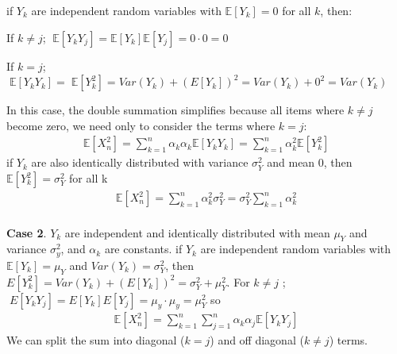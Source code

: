 if $Y_k$ are independent random variables with $\mathbb{E}[Y_k] = 0$ for all $k$, then:

If $k \ne  j$;  $\;\mathbb{E}[Y_kY_j]= \mathbb{E}[Y_k]\mathbb{E}[Y_j]=0\cdot 0=0$

If $k = j$;  $\;\mathbb{E}[Y_kY_k] = \;\mathbb{E}[Y_k^2] = Var(Y_k) + (E[Y_k])^2 = Var(Y_k) + 0^2=Var(Y_k)$

In this case, the double summation simplifies because all items where $k \ne j$ become zero, we need only to consider the terms where $k=j$:
\begin{align*}
\mathbb{E}[X_n^2]=\sum_{k=1}^n\alpha_k\alpha_k \mathbb{E}[Y_kY_k] = \sum_{k=1}^n \alpha_k^2  \mathbb{E}[Y_k^2]
\end{align*}
if $Y_k$ are also identically distributed with variance $\sigma_Y^2$ and mean 0, then $\mathbb{E}[Y_k^2]=\sigma_Y^2$ for all k
\begin{align*}
\mathbb{E}[X_n^2]=\sum_{k=1}^n\alpha_k^2 \sigma_Y^2 = \sigma_Y^2 \sum_{k=1}^n\alpha_k^2
\end{align*}
\\
\textbf{Case 2}. $Y_k$ are independent and identically distributed with mean $\mu_Y$ and variance $\sigma_y^2$, and $\alpha_k$ are constants.
if $Y_k$ are independent random variables with $\mathbb{E}[Y_k]=\mu_Y$ and $Var(Y_k)=\sigma_Y^2$, then $E[Y_k^2]=Var(Y_k) + (E[Y_k])^2 = \sigma_Y^2 +\mu_Y^2$.
For $k \ne j$ ; $\;E[Y_kY_j] = E[Y_k]E[Y_j] = \mu_y \cdot \mu_y = \mu_Y^2$
so
\begin{align*}
\mathbb{E}[X_n^2]=\sum_{k=1}^n\sum_{j=1}^n \alpha_k  \alpha_j \mathbb{E}[Y_kY_j]
\end{align*}
We can split the sum into diagonal ($k=j$) and off diagonal ($k\ne j$)  terms.

